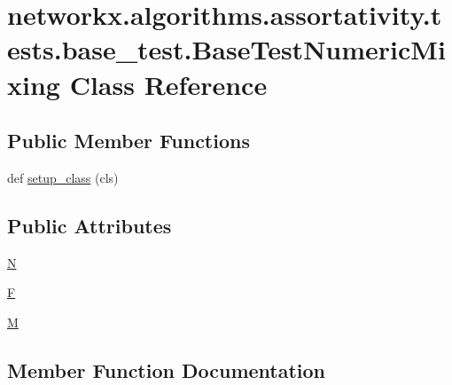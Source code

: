 \hypertarget{classnetworkx_1_1algorithms_1_1assortativity_1_1tests_1_1base__test_1_1BaseTestNumericMixing}{}\section{networkx.\+algorithms.\+assortativity.\+tests.\+base\+\_\+test.\+Base\+Test\+Numeric\+Mixing Class Reference}
\label{classnetworkx_1_1algorithms_1_1assortativity_1_1tests_1_1base__test_1_1BaseTestNumericMixing}
\subsection*{Public Member Functions}
\begin{DoxyCompactItemize}
\item 
def \hyperlink{classnetworkx_1_1algorithms_1_1assortativity_1_1tests_1_1base__test_1_1BaseTestNumericMixing_a5a377387e18eb26330d8a60815c416e7}{setup\+\_\+class} (cls)
\end{DoxyCompactItemize}
\subsection*{Public Attributes}
\begin{DoxyCompactItemize}
\item 
\hyperlink{classnetworkx_1_1algorithms_1_1assortativity_1_1tests_1_1base__test_1_1BaseTestNumericMixing_a6f980bbd4e74d9c3af41e982a1dd5a73}{N}
\item 
\hyperlink{classnetworkx_1_1algorithms_1_1assortativity_1_1tests_1_1base__test_1_1BaseTestNumericMixing_a01f139c4ef4f5a12997374b2291baba8}{F}
\item 
\hyperlink{classnetworkx_1_1algorithms_1_1assortativity_1_1tests_1_1base__test_1_1BaseTestNumericMixing_ae67f061af7ab389f7764acd388e93a3c}{M}
\end{DoxyCompactItemize}


\subsection{Member Function Documentation}
\mbox{\label{classnetworkx_1_1algorithms_1_1assortativity_1_1tests_1_1base__test_1_1BaseTestNumericMixing_a5a377387e18eb26330d8a60815c416e7}} 
